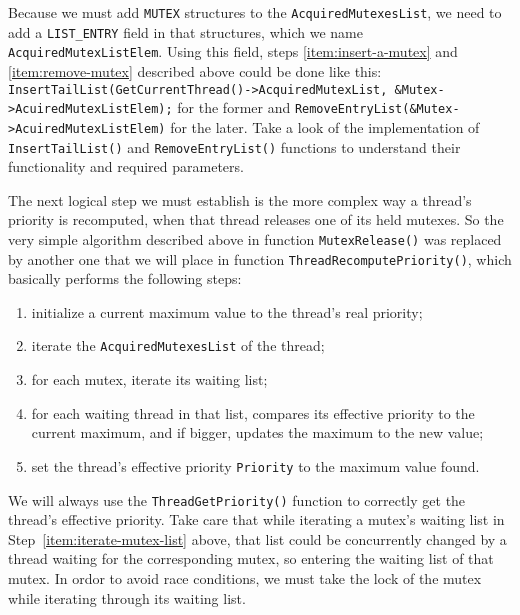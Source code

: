 Because we must add \lstinline|MUTEX| structures to the \lstinline|AcquiredMutexesList|, we need to add a \lstinline|LIST_ENTRY| field in that structures, which we name \lstinline|AcquiredMutexListElem|. Using this field, steps \ref{item:insert-a-mutex} and \ref{item:remove-mutex} described above could be done like this: \lstinline|InsertTailList(GetCurrentThread()->AcquiredMutexList, &Mutex->AcuiredMutexListElem);| for the former and \lstinline|RemoveEntryList(&Mutex->AcuiredMutexListElem)| for the later. Take a look of the implementation of \lstinline|InsertTailList()| and \lstinline|RemoveEntryList()| functions to understand their functionality and required parameters. 

The next logical step we must establish is the more complex way a thread's priority is recomputed, when that thread releases one of its held mutexes. So the very simple algorithm described above in function \lstinline|MutexRelease()| was replaced by another one that we will place in function \lstinline|ThreadRecomputePriority()|, which basically performs the following steps:
\begin{enumerate}
    \item initialize a current maximum value to the thread's real priority;
    \item iterate the \lstinline|AcquiredMutexesList| of the thread;
    \item \label{item:iterate-mutex-list} for each mutex, iterate its waiting list;
    \item for each waiting thread in that list, compares its effective priority to the current maximum, and if bigger, updates the maximum to the new value;
    \item set the thread's effective priority \lstinline|Priority| to the maximum value found.
\end{enumerate}

We will always use the \lstinline|ThreadGetPriority()| function to correctly get the thread's effective priority. Take care that while iterating a mutex's waiting list in Step~\ref{item:iterate-mutex-list} above, that list could be concurrently changed by a thread waiting for the corresponding mutex, so entering the waiting list of that mutex. In ordor to avoid race conditions, we must take the lock of the mutex while iterating through its waiting list. 


